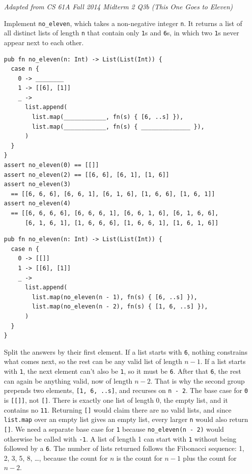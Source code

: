 
\begin{blocksection}
\question \textit{Adapted from CS 61A Fall 2014 Midterm 2 Q3b (This One Goes to Eleven)}

Implement \texttt{no\_eleven}, which takes a non-negative integer \texttt{n}. It returns a list of all distinct lists of length \texttt{n} that contain only \texttt{1}s and \texttt{6}s, in which two \texttt{1}s never appear next to each other.
\begin{lstlisting}
pub fn no_eleven(n: Int) -> List(List(Int)) {
  case n {
    0 -> ________
    1 -> [[6], [1]]
    _ ->
      list.append(
        list.map(____________, fn(s) { [6, ..s] }),
        list.map(____________, fn(s) { ______________ }),
      )
  }
}
assert no_eleven(0) == [[]]
assert no_eleven(2) == [[6, 6], [6, 1], [1, 6]]
assert no_eleven(3)
  == [[6, 6, 6], [6, 6, 1], [6, 1, 6], [1, 6, 6], [1, 6, 1]]
assert no_eleven(4)
  == [[6, 6, 6, 6], [6, 6, 6, 1], [6, 6, 1, 6], [6, 1, 6, 6],
      [6, 1, 6, 1], [1, 6, 6, 6], [1, 6, 6, 1], [1, 6, 1, 6]]
\end{lstlisting}
\begin{solution}
\begin{lstlisting}
pub fn no_eleven(n: Int) -> List(List(Int)) {
  case n {
    0 -> [[]]
    1 -> [[6], [1]]
    _ ->
      list.append(
        list.map(no_eleven(n - 1), fn(s) { [6, ..s] }),
        list.map(no_eleven(n - 2), fn(s) { [1, 6, ..s] }),
      )
  }
}
\end{lstlisting}
\end{solution}
\begin{questionmeta}
  Split the answers by their first element. If a list starts with \texttt{6}, nothing constrains what comes next, so the rest can be any valid list of length $n - 1$. If a list starts with \texttt{1}, the next element can't also be \texttt{1}, so it must be \texttt{6}. After that \texttt{6}, the rest can again be anything valid, now of length $n - 2$. That is why the second group prepends two elements, \lstinline{[1, 6, ..s]}, and recurses on \lstinline{n - 2}.
  The base case for \texttt{0} is \lstinline{[[]]}, not \lstinline{[]}. There is exactly one list of length 0, the empty list, and it contains no \texttt{11}. Returning \lstinline{[]} would claim there are no valid lists, and since \lstinline{list.map} over an empty list gives an empty list, every larger \texttt{n} would also return \lstinline{[]}.
  We need a separate base case for \texttt{1} because \lstinline{no_eleven(n - 2)} would otherwise be called with \lstinline{-1}. A list of length 1 can start with \texttt{1} without being followed by a \texttt{6}.
  The number of lists returned follows the Fibonacci sequence: 1, 2, 3, 5, 8, \ldots, because the count for $n$ is the count for $n - 1$ plus the count for $n - 2$.
\end{questionmeta}
\end{blocksection}
